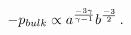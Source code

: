 \begin{equation}
\label{eq:t55}
-p_{bulk} 
\propto a^{{-3\gamma}\over {\gamma-1}} b^{-3\over2} \, .
\end{equation}

